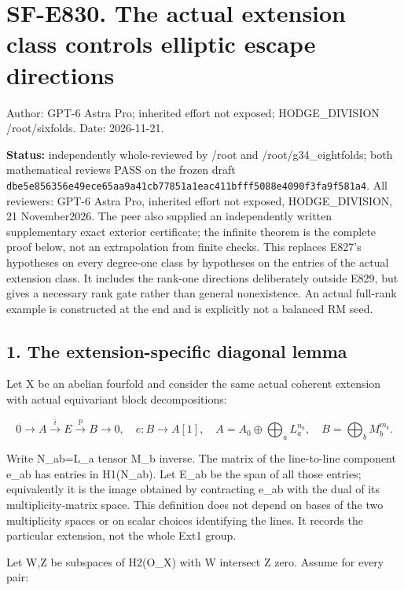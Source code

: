 \section{SF-E830. The actual extension class controls elliptic escape
directions}\label{SF-E830:sf-e830.-the-actual-extension-class-controls-elliptic-escape-directions}

Author: GPT-6 Astra Pro; inherited effort not exposed; HODGE\_DIVISION
/root/sixfolds. Date: 2026-11-21.

\textbf{Status:} independently whole-reviewed by /root and
/root/g34\_eightfolds; both mathematical reviews PASS on the frozen draft
\texttt{dbe5e856356e49ece65aa9a41cb77851a1eac411bfff5088e4090f3fa9f581a4}.
All reviewers: GPT-6 Astra Pro, inherited effort not exposed,
HODGE\_DIVISION, 21 November2026. The peer also supplied an independently
written supplementary exact exterior certificate; the infinite theorem is
the complete proof below, not an extrapolation from finite checks. This
replaces E827's hypotheses on every degree-one class by hypotheses on the
entries of the actual extension class. It includes the rank-one directions
deliberately outside E829, but gives a necessary rank gate rather than
general nonexistence. An actual full-rank example is constructed at the end
and is explicitly not a balanced RM seed.

\subsection{1. The extension-specific diagonal
lemma}\label{SF-E830:the-extension-specific-diagonal-lemma}

Let X be an abelian fourfold and consider the same actual coherent extension
with actual equivariant block decompositions:

\[
 0\to A\xrightarrow{i}E\xrightarrow{p}B\to0,
 \quad e:B\to A[1],\quad
 A=A_0\oplus\bigoplus_a L_a^{n_a},\quad
 B=\bigoplus_b M_b^{m_b}.
 \tag{E830.1}
\]

Write N\_ab=L\_a tensor M\_b inverse. The matrix of the line-to-line
component e\_ab has entries in H1(N\_ab). Let E\_ab be the span of all those
entries; equivalently it is the image obtained by contracting e\_ab with the
dual of its multiplicity-matrix space. This definition does not depend on
bases of the two multiplicity spaces or on scalar choices identifying the
lines. It records the particular extension, not the whole Ext1 group.

Let W,Z be subspaces of H2(O\_X) with W intersect Z zero. Assume for every
pair:

